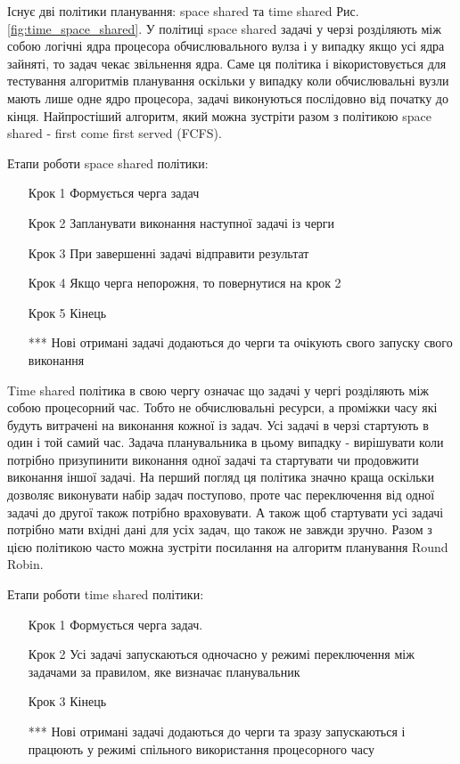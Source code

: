 Існує дві політики планування: space shared та time shared Рис. \ref{fig:time_space_shared}. У політиці space shared задачі у черзі розділяють між собою логічні ядра процесора обчислювального вулза і у випадку якщо усі ядра зайняті, то задач чекає звільнення ядра. Саме ця політика і вікористовується для тестування алгоритмів планування оскільки у випадку коли обчислювальні вузли мають лише одне ядро процесора, задачі виконуються послідовно від початку до кінця. Найпростіший алгоритм, який можна зустріти разом з політикою space shared - first come first served (FCFS).

Етапи роботи space shared політики:
\begin{itemize}
	\item[Крок 1] Формується черга задач
	\item[Крок 2] Запланувати виконання наступної задачі із черги
	\item[Крок 3] При завершенні задачі відправити результат
	\item[Крок 4] Якщо черга непорожня, то повернутися на крок 2
	\item[Крок 5] Кінець
	\item[***] Нові отримані задачі додаються до черги та очікують свого запуску свого виконання
\end{itemize}

Time shared політика в свою чергу означає що задачі у чергі розділяють між собою процесорний час. Тобто не обчислювальні ресурси, а проміжки часу які будуть витрачені на виконання кожної із задач. Усі задачі в черзі стартують в один і той самий час. Задача планувальника в цьому випадку - вирішувати коли потрібно призупинити виконання одної задачі та стартувати чи продовжити виконання іншої задачі. На перший погляд ця політика значно краща оскільки дозволяє виконувати набір задач поступово, проте час переключення від одної задачі до другої також потрібно враховувати. А також щоб стартувати усі задачі потрібно мати вхідні дані для усіх задач, що також не завжди зручно. Разом з цією політикою часто можна зустріти посилання на алгоритм планування Round Robin.

Етапи роботи time shared політики:
\begin{itemize}
	\item[Крок 1] Формується черга задач.
	\item[Крок 2] Усі задачі запускаються одночасно у режимі переключення між задачами за правилом, яке визначає планувальник
	\item[Крок 3] Кінець
	\item[***] Нові отримані задачі додаються до черги та зразу запускаються і працюють у режимі спільного використання процесорного часу
\end{itemize}

